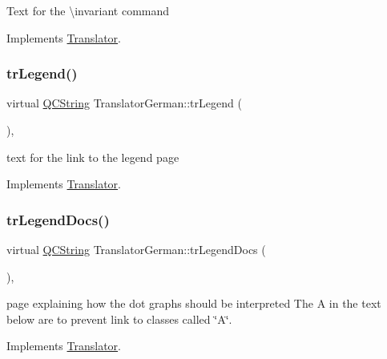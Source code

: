Text for the \textbackslash{}invariant command 

Implements \mbox{\hyperlink{class_translator}{Translator}}.

\mbox{\label{class_translator_german_a2e5ee0db910eaf2d6ca822c821434681}} 
\subsubsection{\texorpdfstring{trLegend()}{trLegend()}}
{\footnotesize\ttfamily virtual \mbox{\hyperlink{class_q_c_string}{Q\+C\+String}} Translator\+German\+::tr\+Legend (\begin{DoxyParamCaption}{ }\end{DoxyParamCaption})\hspace{0.3cm}{\ttfamily [inline]}, {\ttfamily [virtual]}}

text for the link to the legend page 

Implements \mbox{\hyperlink{class_translator}{Translator}}.

\mbox{\label{class_translator_german_a30305e1eeda5c9bb9b0043582c47ad82}} 
\subsubsection{\texorpdfstring{trLegendDocs()}{trLegendDocs()}}
{\footnotesize\ttfamily virtual \mbox{\hyperlink{class_q_c_string}{Q\+C\+String}} Translator\+German\+::tr\+Legend\+Docs (\begin{DoxyParamCaption}{ }\end{DoxyParamCaption})\hspace{0.3cm}{\ttfamily [inline]}, {\ttfamily [virtual]}}

page explaining how the dot graph\textquotesingle{}s should be interpreted The A in the text below are to prevent link to classes called \char`\"{}\+A\char`\"{}. 

Implements \mbox{\hyperlink{class_translator}{Translator}}.

\mbox{\label{class_translator_german_ac02aa6eb6438b922782b1dbed2ca3f7c}} 
